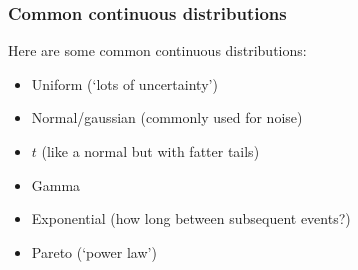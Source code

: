 \documentclass{beamer}
\begin{document}
\begin{frame}[t, fragile]
\frametitle{Common continuous distributions}

Here are some common continuous distributions:

\begin{itemize}
\item <2-> Uniform (`lots of uncertainty')
\item <3-> Normal/gaussian (commonly used for noise)
\item <4-> $t$ (like a normal but with fatter tails)
\item <5-> Gamma
\item <6-> Exponential (how long between subsequent events?)
\item <7-> Pareto (`power law')
\end{itemize}

\end{frame}
\end{document}
